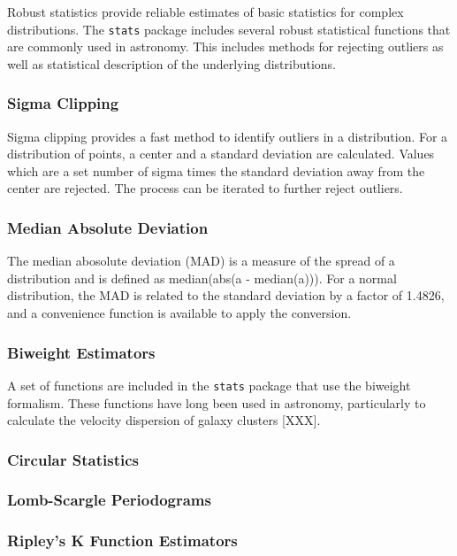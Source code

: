 \documentclass[modern]{aastex61}
\newcommand{\package}[1]{\texttt{#1}}
\begin{document}
Robust statistics provide reliable estimates of basic statistics for complex distributions. The \package{stats} package includes several robust statistical functions that are commonly used in astronomy. This includes methods for rejecting outliers as well as statistical description of the underlying distributions.

\subsubsection{Sigma Clipping}

Sigma clipping provides a fast method to identify outliers in a distribution. For a distribution of points, a center and a standard deviation are calculated. Values which are a set number of sigma times the standard deviation away from the center are rejected. The process can be iterated to further reject outliers.

\subsubsection{Median Absolute Deviation}

The median abosolute deviation (MAD) is a measure of the spread of a distribution and is defined as median(abs(a - median(a))). For a normal distribution, the MAD is related to the standard deviation by a factor of 1.4826, and a convenience function is available to apply the conversion.

\subsubsection{Biweight Estimators}

A set of functions are included in the \package{stats} package that use the biweight formalism. These functions have long been used in astronomy, particularly to calculate the velocity dispersion of galaxy clusters [XXX].

\subsubsection{Circular Statistics}
\subsubsection{Lomb-Scargle Periodograms}
\subsubsection{Ripley's K Function Estimators}
\end{document}
